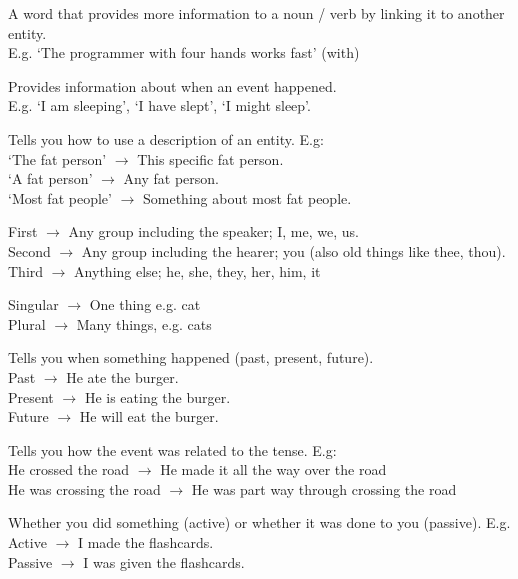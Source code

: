  {
	A word that provides more information to a noun / verb by linking it to another entity.
	\\\vspace{0.5em}
	E.g. `The programmer with four hands works fast' (with)
}

 {
	Provides information about when an event happened.
	\\\vspace{0.5em}
	E.g. `I am sleeping', `I have slept', `I might sleep'.
}

 {
	Tells you how to use a description of an entity. E.g:
	\\\vspace{0.5em} `The fat person' $\rightarrow$ This specific fat person.
	\\\vspace{0.5em} `A fat person' $\rightarrow$ Any fat person.
	\\\vspace{0.5em} `Most fat people' $\rightarrow$ Something about most fat people.
}

 {
	First $\rightarrow$ Any group including the speaker; I, me, we, us.
	\\\vspace{0.5em}
	Second $\rightarrow$ Any group including the hearer; you (also old things like thee, thou).
	\\\vspace{0.5em}
	Third $\rightarrow$ Anything else; he, she, they, her, him, it
}

 {
	Singular $\rightarrow$ One thing e.g. cat
	\\\vspace{0.5em}
	Plural $\rightarrow$ Many things, e.g. cats
}

 {
	Tells you when something happened (past, present, future).
	\\\vspace{0.5em} Past $\rightarrow$ He ate the burger.
	\\\vspace{0.5em} Present $\rightarrow$ He is eating the burger.
	\\\vspace{0.5em} Future $\rightarrow$ He will eat the burger.
}

 {
	Tells you how the event was related to the tense. E.g:
	\\\vspace{0.5em} He crossed the road $\rightarrow$ He made it all the way over the road
	\\\vspace{0.5em} He was crossing the road $\rightarrow$ He was part way through crossing the road
}

 {
	Whether you did something (active) or whether it was done to you (passive). E.g.
	\\\vspace{0.5em} Active $\rightarrow$ I made the flashcards.
	\\\vspace{0.5em} Passive $\rightarrow$ I was given the flashcards.
}